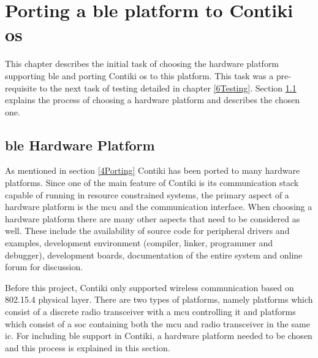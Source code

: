 \chapter{Porting a \gls{ble} platform to Contiki \gls{os}}
This chapter describes the initial task of choosing the hardware platform supporting \gls{ble} and porting Contiki \gls{os} to this platform. This task was a pre-requisite to the next task of testing detailed in chapter \ref{6Testing}. Section \ref{5HwPlt} explains the process of choosing a hardware platform and describes the chosen one. 

\section{\gls{ble} Hardware Platform} \label{5HwPlt}

As mentioned in section \ref{4Porting} Contiki has been ported to many hardware platforms. Since one of the main feature of Contiki is its communication stack capable of running in resource constrained systems, the primary aspect of a hardware platform is the \gls{mcu} and the communication interface. When choosing a hardware platform there are many other aspects that need to be considered as well. These include the availability of source code for peripheral drivers and examples, development environment (compiler, linker, programmer and debugger), development boards, documentation of the entire system and online forum for discussion.

Before this project, Contiki only supported wireless communication based on 802.15.4 physical layer. There are two types of platforms, namely platforms which consist of a discrete radio transceiver with a \gls{mcu} controlling it and platforms which consist of a \gls{soc} containing both the \gls{mcu} and radio transceiver in the same \gls{ic}. For including \gls{ble} support in Contiki, a hardware platform needed to be chosen and this process is explained in this section.

